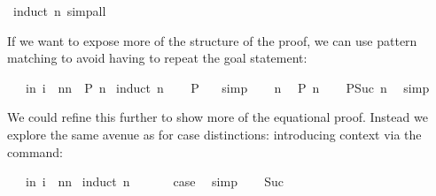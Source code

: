 \begin{isabellebody}
\isamarkupfalse%
\ {\isacharparenleft}induct\ n{\isacharcomma}\ simp{\isacharunderscore}all{\isacharparenright}\isamarkupfalse%
%
\begin{isamarkuptext}%
\noindent If we want to expose more of the structure of the
proof, we can use pattern matching to avoid having to repeat the goal
statement:%
\end{isamarkuptext}%
\isamarkuptrue%
\ {\isachardoublequote}{}\ {\isacharasterisk}\ {\isacharparenleft}{\isasymSum}i{\isacharless}n{\isacharplus}{}{\isachardot}\ i{\isacharparenright}\ {\isacharequal}\ n{\isacharasterisk}{\isacharparenleft}n{\isacharplus}{}{\isacharparenright}{\isachardoublequote}\ {\isacharparenleft}\ {\isachardoublequote}{\isacharquery}P\ n{\isachardoublequote}{\isacharparenright}\isanewline
\isamarkupfalse%
\ {\isacharparenleft}induct\ n{\isacharparenright}\isanewline
\ \ \isamarkupfalse%
\ {\isachardoublequote}{\isacharquery}P\ {}{\isachardoublequote}\ \isamarkupfalse%
\ simp\isanewline
\isamarkupfalse%
\isanewline
\ \ \isamarkupfalse%
\ n\ \isamarkupfalse%
\ {\isachardoublequote}{\isacharquery}P\ n{\isachardoublequote}\isanewline
\ \ \isamarkupfalse%
\ {\isachardoublequote}{\isacharquery}P{\isacharparenleft}Suc\ n{\isacharparenright}{\isachardoublequote}\ \isamarkupfalse%
\ simp\isanewline
\isamarkupfalse%
\isamarkupfalse%
%
\begin{isamarkuptext}%
\noindent We could refine this further to show more of the equational
proof. Instead we explore the same avenue as for case distinctions:
introducing context via the  command:%
\end{isamarkuptext}%
\isamarkuptrue%
\ {\isachardoublequote}{}\ {\isacharasterisk}\ {\isacharparenleft}{\isasymSum}i{\isacharless}n{\isacharplus}{}{\isachardot}\ i{\isacharparenright}\ {\isacharequal}\ n{\isacharasterisk}{\isacharparenleft}n{\isacharplus}{}{\isacharparenright}{\isachardoublequote}\isanewline
\isamarkupfalse%
\ {\isacharparenleft}induct\ n{\isacharparenright}\isanewline
\ \ \isamarkupfalse%
\ {}\ \isamarkupfalse%
\ {\isacharquery}case\ \isamarkupfalse%
\ simp\isanewline
\isamarkupfalse%
\isanewline
\ \ \isamarkupfalse%
\ Suc\ \isamarkupfalse%

\end{isabellebody}
